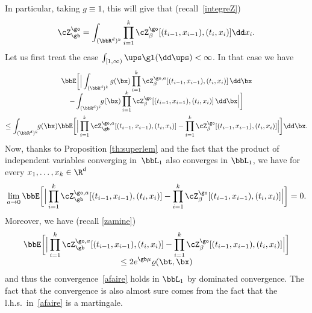 In particular, taking $g\equiv 1$, this will give that (recall~\eqref{integreZ})
\begin{equation}
\label{integreZ2}
\cZ_{\gb}^{\go} = \int_{(\bbR^d)^k} \prod_{i=1}^k \cZ^{\go}_{\beta}[(t_{i-1},x_{i-1}),(t_i,x_{i})] \dd x_i.
\end{equation}
Let us first treat the case $\int_{[1,\infty)} \ups \gl(\dd \ups)<\infty$. In that case we have\vspace*{-5pt}
\begin{multline*}
\bbE \bigg[ \Big|\int_{(\bbR^d)^k} g(\bx)\prod_{i=1}^k \cZ^{\go,a}_{\beta}[(t_{i-1},x_{i-1}),(t_i,x_{i})] \,\dd \bx
\\[-7pt]
-\int_{(\bbR^d)^k} \!\! g(\bx)\prod_{i=1}^k \cZ^{\go}_{\beta}[(t_{i-1},x_{i-1}),(t_i,x_{i})] \,\dd \bx \Big|\bigg] \\
\le \int_{(\bbR^d)^k} \!\! g(\bx) \bbE \bigg[ \Big| \prod_{i=1}^k \cZ^{\go,a}_{\gb}[(t_{i-1},x_{i-1}),(t_i,x_{i})]
- \prod_{i=1}^k \cZ^{\go}_{\beta}[(t_{i-1},x_{i-1}),(t_i,x_{i})] \Big|\bigg] \dd \bx.
\end{multline*}
Now, thanks to Proposition \ref{th:superlem} and the fact
that the product of independent variables converging in~$\bbL_1$
also converges in $\bbL_1$, we have for every $x_1,\dots, x_k \in \R^d$
\begin{equation}
\label{eq:conv1}
\lim_{a\to 0}\bbE \bigg[ \Big| \prod_{i=1}^k \cZ^{\go,a}_{\gb}[(t_{i-1},x_{i-1}),(t_i,x_{i})]
- \prod_{i=1}^k \cZ^{\go}_{\beta}[(t_{i-1},x_{i-1}),(t_i,x_{i})] \Big|\bigg]=0.
\end{equation}
Moreover, we have (recall \eqref{zamine})\vspace*{-5pt}
\begin{multline}
\label{eq:domin1}
\bbE \bigg[ \Big| \prod_{i=1}^k \cZ^{\go,a}_{\gb}[(t_{i-1},x_{i-1}),(t_i,x_{i})]
- \prod_{i=1}^k \cZ^{\go}_{\beta}[(t_{i-1},x_{i-1}),(t_i,x_{i})] \Big|\bigg]\\[-5pt]
\le 2 e^{\gb \mu } \varrho(\bt,\bx)
\end{multline}
and thus
the convergence~\eqref{afaire} holds in $\bbL_1$ by dominated convergence.
The fact that the convergence is also almost sure
comes from the fact that the l.h.s.\ in~\eqref{afaire}
is a martingale.

